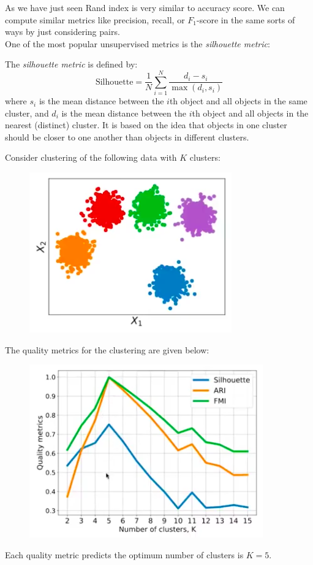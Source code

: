 As we have just seen Rand index is very similar to accuracy score. We can compute similar metrics like precision, recall, or $F_1$-score in the same sorts of ways by just considering pairs.\\

One of the most popular unsupervised metrics is the \textit{silhouette metric}:
\begin{framedef}
The \textit{silhouette metric} is defined by:
\begin{equation*}
\textrm{Silhouette} = \frac{1}{N} \sum_{i=1}^{N} \frac{d_i  - s_i}{\max(d_i ,s_i)}
\end{equation*}
where $s_i$ is the mean distance between the $i$th object and all objects in the same cluster, and $d_i$ is the mean distance between the $i$th object and all objects in the nearest (distinct) cluster. It is based on the idea that objects in one cluster should be closer to one another than objects in different clusters.
\end{framedef}

\begin{frameex}
Consider clustering of the following data with $K$ clusters:
\begin{figure}[H]
\centering
\includegraphics[scale=0.4]{clusterquality1.png}
\end{figure}
The quality metrics for the clustering are given below:
\begin{figure}[H]
\centering
\includegraphics[scale=0.4]{clusterquality2.png}
\end{figure}
Each quality metric predicts the optimum number of clusters is $K=5$.
\end{frameex}



